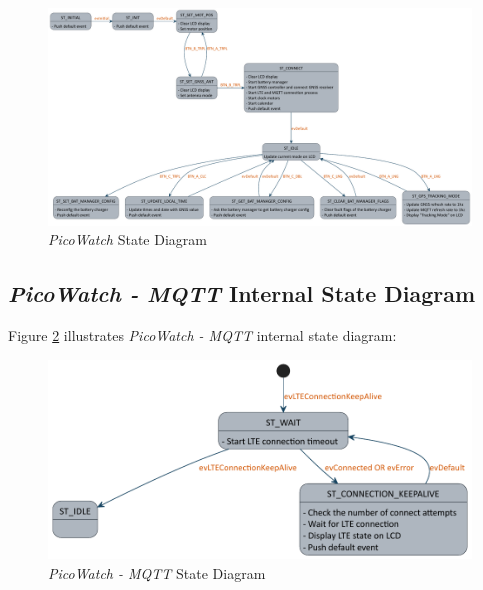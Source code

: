 \documentclass[report.tex]{subfiles}
\begin{document}
\begin{figure}[H]
	\centering
	\includegraphics[width=1\textwidth]{Include/Figure/software/state/picoWatch.pdf}
	\caption{\textit{PicoWatch} State Diagram}
	\label{fig:picoWatch}
\end{figure}

\subsection{\textit{PicoWatch - MQTT} Internal State Diagram}

Figure \ref{fig:picoWatchInternal} illustrates \textit{PicoWatch - MQTT} internal state diagram: 

\begin{figure}[H]
	\centering
	\includegraphics[width=1\textwidth]{Include/Figure/software/state/picoWatchInternal.pdf}
	\caption{\textit{PicoWatch - MQTT} State Diagram}
	\label{fig:picoWatchInternal}
\end{figure}
\end{document}
